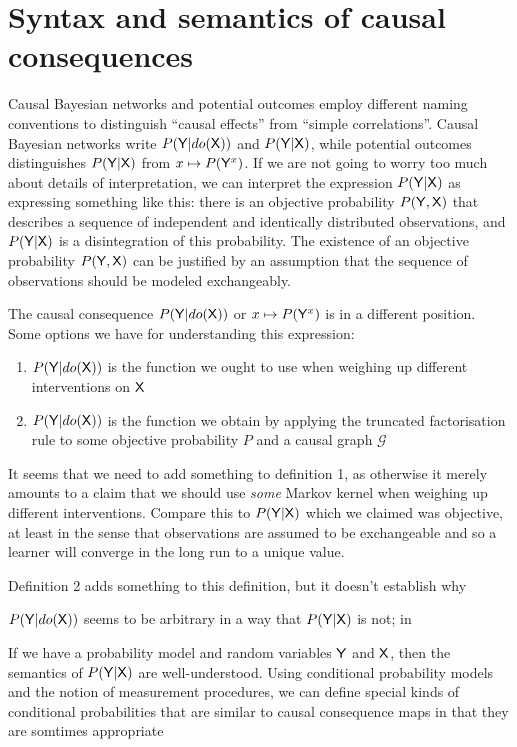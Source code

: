 


\section{Syntax and semantics of causal consequences}

Causal Bayesian networks and potential outcomes employ different naming conventions to distinguish ``causal effects'' from ``simple correlations''. Causal Bayesian networks write $P(\mathsf{Y}|do(\mathsf{X}))$ and $P(\mathsf{Y}|\mathsf{X})$, while potential outcomes distinguishes $P(\mathsf{Y}|\mathsf{X})$ from $x\mapsto P(\mathsf{Y}^x)$. If we are not going to worry too much about details of interpretation, we can interpret the expression $P(\mathsf{Y}|\mathsf{X})$ as expressing something like this: there is an objective probability $P(\mathsf{Y},\mathsf{X})$ that describes a sequence of independent and identically distributed observations, and $P(\mathsf{Y}|\mathsf{X})$ is a disintegration of this probability. The existence of an objective probability $P(\mathsf{Y},\mathsf{X})$ can be justified by an assumption that the sequence of observations should be modeled exchangeably.

The causal consequence $P(\mathsf{Y}|do(\mathsf{X}))$ or $x\mapsto P(\mathsf{Y}^x)$ is in a different position. Some options we have for understanding this expression:
\begin{enumerate}
    \item $P(\mathsf{Y}|do(\mathsf{X}))$ is the function we ought to use when weighing up different interventions on $\mathsf{X}$
    \item $P(\mathsf{Y}|do(\mathsf{X}))$ is the function we obtain by applying the truncated factorisation rule to some objective probability $P$ and a causal graph $\mathcal{G}$
\end{enumerate}

It seems that we need to add something to definition 1, as otherwise it merely amounts to a claim that we should use \emph{some} Markov kernel when weighing up different interventions. Compare this to $P(\mathsf{Y}|\mathsf{X})$ which we claimed was objective, at least in the sense that observations are assumed to be exchangeable and so a learner will converge in the long run to a unique value.

Definition 2 adds something to this definition, but it doesn't establish why 

$P(\mathsf{Y}|do(\mathsf{X}))$ seems to be arbitrary in a way that $P(\mathsf{Y}|\mathsf{X})$ is not; in 


If we have a probability model and random variables $\mathsf{Y}$ and $\mathsf{X}$, then the semantics of $P(\mathsf{Y}|\mathsf{X})$ are well-understood. Using conditional probability models and the notion of measurement procedures, we can define special kinds of conditional probabilities that are similar to causal consequence maps in that they are somtimes appropriate 




